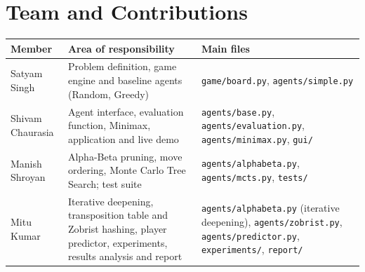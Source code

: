 \documentclass[11pt,a4paper]{article}
\newcommand{\code}[1]{\texttt{\small #1}}
\begin{document}
\section*{Team and Contributions}

\begin{center}
\small
\begin{tabularx}{\textwidth}{@{}l Y Y@{}}
\toprule
\textbf{Member} & \textbf{Area of responsibility} & \textbf{Main files} \\
\midrule
Satyam Singh & Problem definition, game engine and baseline agents (Random, Greedy) & \code{game/board.py}, \code{agents/simple.py} \\
Shivam Chaurasia & Agent interface, evaluation function, Minimax, application and live demo & \code{agents/base.py}, \code{agents/evaluation.py}, \code{agents/minimax.py}, \code{gui/} \\
Manish Shroyan & Alpha-Beta pruning, move ordering, Monte Carlo Tree Search; test suite & \code{agents/alphabeta.py}, \code{agents/mcts.py}, \code{tests/} \\
Mitu Kumar & Iterative deepening, transposition table and Zobrist hashing, player predictor, experiments, results analysis and report & \code{agents/alphabeta.py} (iterative deepening), \code{agents/zobrist.py}, \code{agents/predictor.py}, \code{experiments/}, \code{report/} \\
\bottomrule
\end{tabularx}
\end{center}
\end{document}
